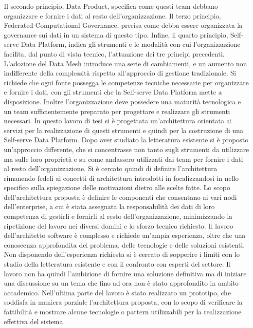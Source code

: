 \documentclass[12pt]{report}
\begin{document}
Il secondo principio, Data Product, specifica come questi team debbano organizzare e fornire i dati al resto dell'organizzazione.
Il terzo principio, Federated Computational Governance, precisa come debba essere organizzata la governance sui dati in un sistema di questo tipo.
Infine, il quarto principio, Self-serve Data Platform, indica gli strumenti e le modalità con cui l'organizzazione facilita, dal punto di vista tecnico, l'attuazione dei tre principi precedenti.
L'adozione del Data Mesh introduce una serie di cambiamenti, e un aumento non indifferente della complessità rispetto all'approccio di gestione tradizionale.
Si richiede che ogni fonte possegga le competenze tecniche necessarie per organizzare e fornire i dati, con gli strumenti che la Self-serve Data Platform mette a disposizione.
Inoltre l'organizzazione deve possedere una maturità tecnologica e un team sufficientemente preparato per progettare e realizzare gli strumenti necessari.
In questo lavoro di tesi si è progettata un'architettura orientata ai servizi per la realizzazione di questi strumenti e quindi per la costruzione di una Self-serve Data Platform.
Dopo aver studiato la letteratura esistente si è proposto un'approccio differente, che si concentrasse non tanto sugli strumenti da utilizzare ma sulle loro proprietà e su come andassero utilizzati dai team per fornire i dati al resto dell'organizzazione.
Si è cercato quindi di definire l'architettura rimanendo fedeli ai concetti di architettura introdotti in \cite{perry_foundations_1992} focalizzandosi in nello specifico sulla spiegazione delle motivazioni dietro alle scelte fatte.
Lo scopo dell'architettura proposta è definire le componenti che consentano ai vari nodi dell'enterprise, a cui è stata assegnata la responsabilità dei dati di loro competenza di gestirli e fornirli al resto dell'organizzazione, minimizzando la ripetizione del lavoro nei diversi domini e lo sforzo tecnico richiesto. 
Il lavoro dell'architetto software è complesso e richiede un'ampia esperienza, oltre che una conoscenza approfondita del problema, delle tecnologie e delle soluzioni esistenti.
Non disponendo dell'esperienza richiesta si è cercato di sopperire i limiti con lo studio della letteratura esistente e con il confronto con esperti del settore.
Il lavoro non ha quindi l'ambizione di fornire una soluzione definitiva ma di iniziare una discussione su un tema che fino ad ora non è stato approfondito in ambito accademico.
Nell'ultima parte del lavoro è stato realizzato un prototipo, che soddisfa in maniera parziale l'architettura proposta, con lo scopo di  verificare la fattibilità e mostrare alcune tecnologie o pattern utilizzabili per la realizzazione effettiva del sistema.
\end{document}
